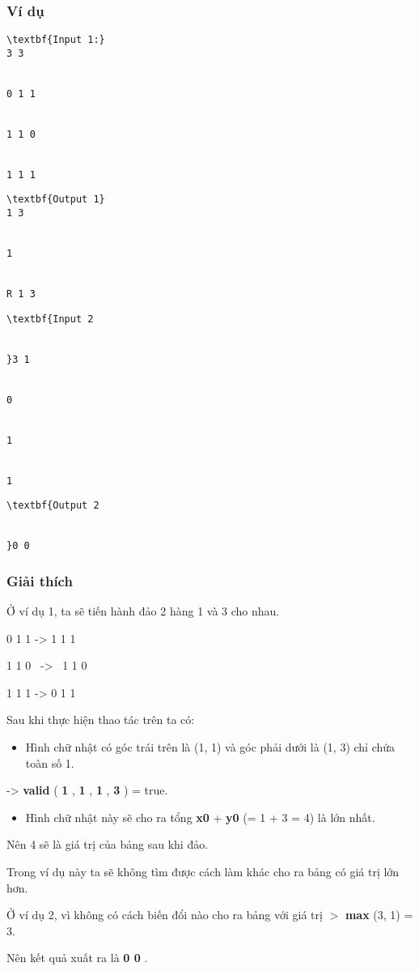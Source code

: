 \subsubsection{   Ví dụ  }
\begin{verbatim}
\textbf{Input 1:}
3 3


0 1 1


1 1 0


1 1 1
\end{verbatim}
\begin{verbatim}
\textbf{Output 1}
1 3


1


R 1 3
\end{verbatim}
\begin{verbatim}
\textbf{Input 2


}3 1


0


1


1\end{verbatim}
\begin{verbatim}
\textbf{Output 2


}0 0\end{verbatim}

\subsubsection{   Giải thích  }

   Ở ví dụ 1, ta sẽ tiến hành đảo 2 hàng 1 và 3 cho nhau.  

    0 1 1      ->   1 1 1

   1 1 0  ->  1 1 0  

1 1 1   ->       0 1 1   

   Sau khi thực hiện thao tác trên ta có:  
\begin{itemize}
	\item     Hình chữ nhật có góc trái trên là (1, 1) và góc phải dưới là (1, 3) chỉ chứa toàn số 1.   
\end{itemize}

   ->   \textbf{    valid   }   (   \textbf{    1   }   ,   \textbf{    1   }   ,   \textbf{    1   }   ,   \textbf{    3   }   ) = true.  
\begin{itemize}
	\item     Hình chữ nhật này sẽ cho ra tổng    \textbf{     x0    }    +    \textbf{     y0    }    (= 1 + 3 = 4) là lớn nhất.   
\end{itemize}

   Nên 4 sẽ là giá trị của bảng sau khi đảo.  

   Trong ví dụ này ta sẽ không tìm được cách làm khác cho ra bảng có giá trị lớn hơn.  

   Ở ví dụ 2, vì không có cách biến đổi nào cho ra bảng với giá trị   \textbf{}\textbf{    $>$   }\textbf{    max   }   (3, 1) = 3.  

   Nên kết quả xuất ra là   \textbf{    0 0   }   .  
